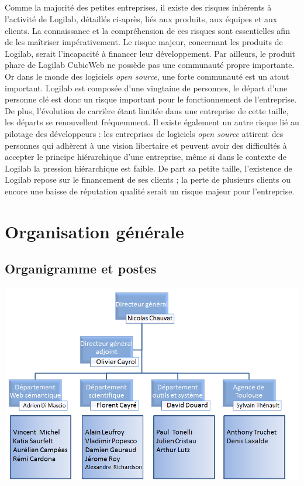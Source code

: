 \documentclass {report}
\begin{document}
\paragraph{}
Comme la majorité des petites entreprises, il existe des risques inhérents à l'activité de Logilab, détaillés ci-après, liés aux produits, aux équipes et aux clients. La connaissance et la compréhension de ces risques sont essentielles afin de les maîtriser impérativement. Le risque majeur, concernant les produits de Logilab, serait l'incapacité à financer leur développement. Par ailleurs, le produit phare de Logilab CubicWeb ne possède pas une communauté propre importante. Or dans le monde des logiciels \textit{open source}, une forte communauté est un atout important. Logilab est composée d'une vingtaine de personnes, le départ d'une personne clé est donc un risque important pour le fonctionnement de l'entreprise. De plus, l'évolution de carrière étant limitée dans une entreprise de cette taille, les départs se renouvellent fréquemment. Il existe également un autre risque lié au pilotage des développeurs : les entreprises de logiciels \textit{open source} attirent des personnes qui adhèrent à une vision libertaire et peuvent avoir des difficultés à accepter le principe hiérarchique d'une entreprise, même si dans le contexte de Logilab la pression hiérarchique est faible. De part sa petite taille, l'existence de Logilab repose sur le financement de ses clients ; la perte de plusieurs clients ou encore une baisse de réputation qualité serait un risque majeur pour l'entreprise.


\chapter{Organisation générale}

\section{Organigramme et postes}

\begin{center}
\includegraphics[scale=0.7]{organigramme.png}
\end{center}
\end{document}
